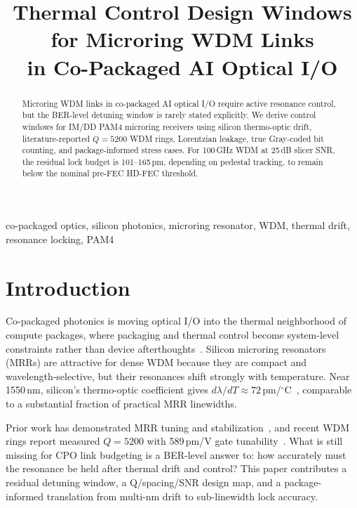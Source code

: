 \documentclass[conference]{IEEEtran}
\begin{document}
\title{Thermal Control Design Windows for Microring WDM Links\\in Co-Packaged AI Optical I/O}

\author{
}

\maketitle

\begin{abstract}
Microring WDM links in co-packaged AI optical I/O require active resonance control, but the BER-level detuning window is rarely stated explicitly. We derive control windows for IM/DD PAM4 microring receivers using silicon thermo-optic drift, literature-reported $Q{=}5200$ WDM rings, Lorentzian leakage, true Gray-coded bit counting, and package-informed stress cases. For 100\,GHz WDM at 25\,dB slicer SNR, the residual lock budget is 101--165\,pm, depending on pedestal tracking, to remain below the nominal pre-FEC HD-FEC threshold.
\end{abstract}

\begin{IEEEkeywords}
co-packaged optics, silicon photonics, microring resonator, WDM, thermal drift, resonance locking, PAM4
\end{IEEEkeywords}
\vspace{-5pt}

\section{Introduction}
Co-packaged photonics is moving optical I/O into the thermal neighborhood of compute packages, where packaging and thermal control become system-level constraints rather than device afterthoughts~\cite{mahajan2022,lee2023,matsumoto2022}. Silicon microring resonators (MRRs) are attractive for dense WDM because they are compact and wavelength-selective, but their resonances shift strongly with temperature. Near 1550\,nm, silicon's thermo-optic coefficient gives $d\lambda/dT\approx72$\,pm/$^\circ$C~\cite{komma2012}, comparable to a substantial fraction of practical MRR linewidths.

Prior work has demonstrated MRR tuning and stabilization~\cite{jayatilleka2015}, and recent WDM rings report measured $Q{=}5200$ with 589\,pm/V gate tunability~\cite{hsu2023}. What is still missing for CPO link budgeting is a BER-level answer to: how accurately must the resonance be held after thermal drift and control? This paper contributes a residual detuning window, a Q/spacing/SNR design map, and a package-informed translation from multi-nm drift to sub-linewidth lock accuracy.
\end{document}
